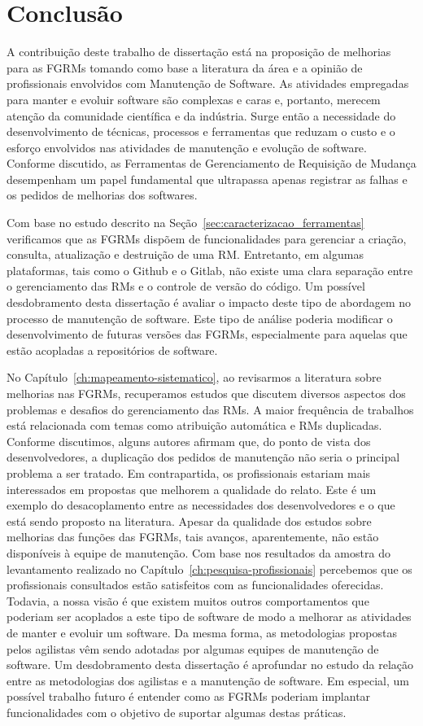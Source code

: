 \chapter{Conclusão}
\label{ch:conclusao_trab_futuros}

A contribuição deste trabalho de dissertação está na proposição de melhorias
para as FGRMs tomando como base a literatura da área e a opinião de
profissionais envolvidos com Manutenção de Software. As atividades empregadas
para manter e evoluir software são complexas e caras e, portanto, merecem
atenção da comunidade científica e da indústria. Surge então a necessidade do
desenvolvimento de técnicas, processos e ferramentas que reduzam o custo e o
esforço envolvidos nas atividades de manutenção e evolução de software.
Conforme discutido, as Ferramentas de Gerenciamento de Requisição de Mudança
desempenham um papel fundamental que ultrapassa apenas registrar as falhas e os
pedidos de melhorias dos softwares.

Com base no estudo descrito na Seção~\ref{sec:caracterizacao_ferramentas}
verificamos que as FGRMs dispõem de funcionalidades para gerenciar a criação,
consulta, atualização e destruição de uma RM\@. Entretanto, em algumas
plataformas, tais como o Github e o Gitlab, não existe uma clara separação
entre o gerenciamento das RMs e o controle de versão do código. Um possível
desdobramento desta dissertação é avaliar o impacto deste tipo de abordagem no
processo de manutenção de software. Este tipo de análise poderia modificar o
desenvolvimento de futuras versões das FGRMs, especialmente para aquelas que
estão acopladas a repositórios de software.

No Capítulo~\ref{ch:mapeamento-sistematico}, ao revisarmos a literatura sobre
melhorias nas FGRMs, recuperamos estudos que discutem diversos aspectos dos
problemas e desafios do gerenciamento das RMs. A maior frequência de trabalhos
está relacionada com temas como atribuição automática e RMs duplicadas.
Conforme discutimos, alguns autores afirmam que, do ponto de vista dos
desenvolvedores, a duplicação dos pedidos de manutenção não seria o principal
problema a ser tratado. Em contrapartida, os profissionais estariam mais
interessados em propostas que melhorem a qualidade do relato. Este é um exemplo
do desacoplamento entre as necessidades dos desenvolvedores e o que está sendo
proposto na literatura. Apesar da qualidade dos estudos sobre melhorias das
funções das FGRMs, tais avanços, aparentemente, não estão disponíveis à equipe
de manutenção. Com base nos resultados da amostra do levantamento realizado no
Capítulo~\ref{ch:pesquisa-profissionais} percebemos que os profissionais
consultados estão satisfeitos com as funcionalidades oferecidas. Todavia, a
nossa visão é que existem muitos outros comportamentos que poderiam ser
acoplados a este tipo de software de modo a melhorar as atividades de manter e
evoluir um software. Da mesma forma, as metodologias propostas pelos agilistas
vêm sendo adotadas por algumas equipes de manutenção de software. Um
desdobramento desta dissertação é aprofundar no estudo da relação entre as
metodologias dos agilistas e a manutenção de software. Em especial, um possível
trabalho futuro é entender como as FGRMs poderiam implantar funcionalidades com
o objetivo de suportar algumas destas práticas.

